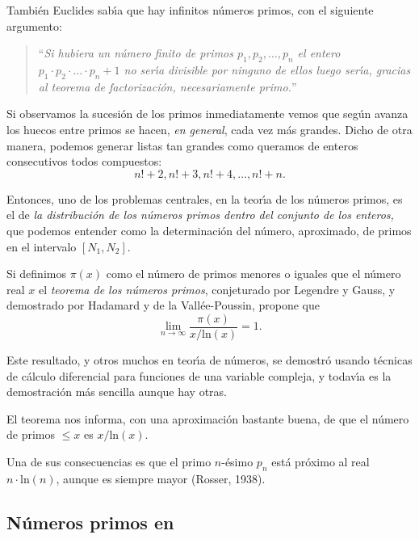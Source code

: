 Tambi\'en Euclides sab\'{\i}a que hay infinitos n\'umeros primos, con el
siguiente argumento:
\begin{quotation}
``{\itshape Si hubiera un n\'umero finito de primos $p_1,p_2,\dots,p_n$ el
entero $p_1\cdot p_2\cdot \dots \cdot p_n+1$ no ser\'{\i}a divisible por ninguno
de ellos luego ser\'{\i}a, gracias al teorema de factorizaci\'on, 
necesariamente primo.}''
\end{quotation}

Si observamos la sucesi\'on de los primos inmediatamente vemos que seg\'un
avanza los huecos entre primos se hacen, {\itshape en general},  cada vez m\'as
grandes. Dicho de otra manera, podemos generar listas tan grandes como queramos
de enteros consecutivos todos compuestos:
\[n!+2,n!+3,n!+4,\dots,n!+n. \]

Entonces, uno de los problemas centrales, en la teor\'{\i}a de los n\'umeros
primos, es el de {\itshape la distribuci\'on de los n\'umeros primos dentro
del conjunto de los enteros,} que podemos entender como la determinaci\'on del
n\'umero, aproximado,  de primos en el intervalo $[N_1,N_2]$. 


Si definimos $\pi(x)$ como el n\'umero de primos menores o iguales que el
n\'umero real $x$ el {\itshape teorema de los n\'umeros primos}, conjeturado por
Legendre y Gauss,  y demostrado por Hadamard y de la Vall\'ee-Poussin, propone
que 
\[\lim_{n\to \infty}\frac{\pi(x)}{x/\mathrm{ln}(x)}=1.\]

Este resultado, y otros muchos en teor\'{\i}a de n\'umeros, se demostr\'o usando
t\'ecnicas de c\'alculo diferencial para funciones de una variable compleja, y
todav\'{\i}a es la demostraci\'on m\'as sencilla aunque hay otras.

El teorema nos informa, con una aproximaci\'on bastante buena,  de que el
n\'umero de primos $\le x$ es $x/\mathrm{ln}(x)$. 

Una de sus consecuencias es que el primo $n$-\'esimo $p_n$ est\'a pr\'oximo al
real $n\cdot \mathrm{ln}(n)$, aunque es siempre mayor (Rosser, 1938).
\subsection{N\'umeros primos en {\sage}}

